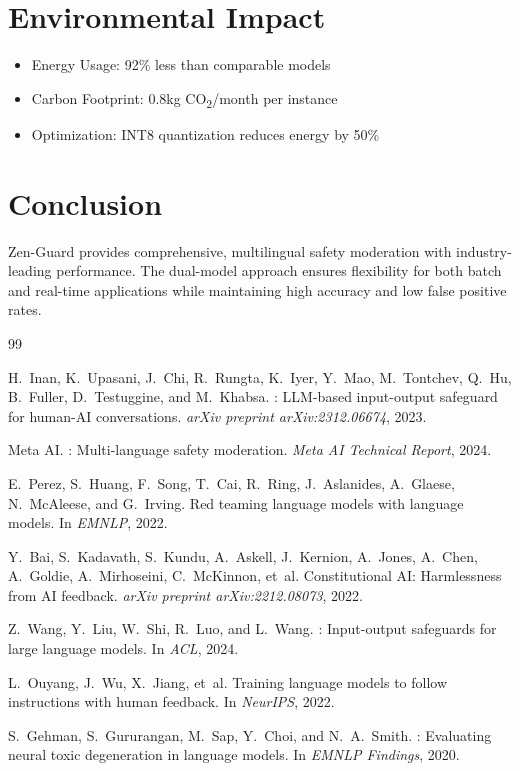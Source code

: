 \documentclass[11pt]{article}
\begin{document}
\section{Environmental Impact}

\begin{itemize}
\item Energy Usage: 92\% less than comparable models
\item Carbon Footprint: 0.8kg CO\textsubscript{2}/month per instance
\item Optimization: INT8 quantization reduces energy by 50\%
\end{itemize}

\section{Conclusion}

Zen-Guard provides comprehensive, multilingual safety moderation with industry-leading performance. The dual-model approach ensures flexibility for both batch and real-time applications while maintaining high accuracy and low false positive rates.

\begin{thebibliography}{99}

H.~Inan, K.~Upasani, J.~Chi, R.~Rungta, K.~Iyer, Y.~Mao, M.~Tontchev,
Q.~Hu, B.~Fuller, D.~Testuggine, and M.~Khabsa.
: {LLM}-based input-output safeguard for human-{AI}
conversations.
\newblock \emph{arXiv preprint arXiv:2312.06674}, 2023.

{Meta AI}.
: Multi-language safety moderation.
\newblock \emph{Meta AI Technical Report}, 2024.

E.~Perez, S.~Huang, F.~Song, T.~Cai, R.~Ring, J.~Aslanides, A.~Glaese,
N.~McAleese, and G.~Irving.
\newblock Red teaming language models with language models.
\newblock In \emph{EMNLP}, 2022.

Y.~Bai, S.~Kadavath, S.~Kundu, A.~Askell, J.~Kernion, A.~Jones,
A.~Chen, A.~Goldie, A.~Mirhoseini, C.~McKinnon, et~al.
\newblock Constitutional {AI}: Harmlessness from {AI} feedback.
\newblock \emph{arXiv preprint arXiv:2212.08073}, 2022.

Z.~Wang, Y.~Liu, W.~Shi, R.~Luo, and L.~Wang.
: Input-output safeguards for large language models.
\newblock In \emph{ACL}, 2024.

L.~Ouyang, J.~Wu, X.~Jiang, et~al.
\newblock Training language models to follow instructions with human feedback.
\newblock In \emph{NeurIPS}, 2022.

S.~Gehman, S.~Gururangan, M.~Sap, Y.~Choi, and N.~A.~Smith.
: Evaluating neural toxic degeneration in
language models.
\newblock In \emph{EMNLP Findings}, 2020.

\end{thebibliography}
\end{document}
